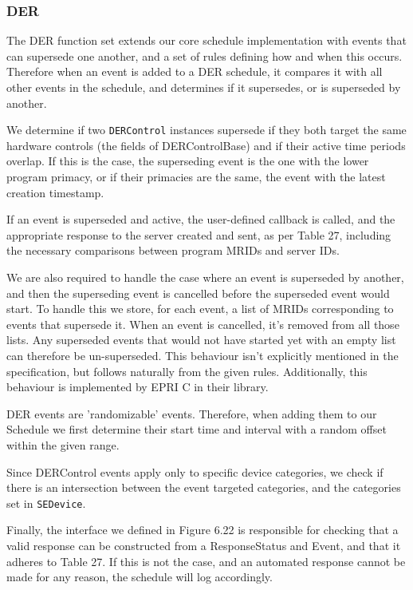 \subsubsection{DER}
The DER function set extends our core schedule implementation with events that can supersede one another, and a set of rules defining how and when this occurs. Therefore when an event is added to a DER schedule, it compares it with all other events in the schedule, and determines if it supersedes, or is superseded by another. 

We determine if two \texttt{DERControl} instances supersede if they both target the same hardware controls (the fields of DERControlBase) and if their active time periods overlap. If this is the case, the superseding event is the one with the lower program primacy, or if their primacies are the same, the event with the latest creation timestamp.

If an event is superseded and active, the user-defined callback is called, and the appropriate response to the server created and sent, as per Table 27, including the necessary comparisons between program MRIDs and server IDs.

We are also required to handle the case where an event is superseded by another, and then the superseding event is cancelled before the superseded event would start. To handle this we store, for each event, a list of MRIDs corresponding to events that supersede it. When an event is cancelled, it's removed from all those lists. Any superseded events that would not have started yet with an empty list can therefore be un-superseded.
This behaviour isn't explicitly mentioned in the specification, but follows naturally from the given rules. Additionally, this behaviour is implemented by EPRI C in their library.

DER events are 'randomizable' events. Therefore, when adding them to our Schedule we first determine their start time and interval with a random offset within the given range.

Since DERControl events apply only to specific device categories, we check if there is an intersection between the event targeted categories, and the categories set in \texttt{SEDevice}.

Finally, the interface we defined in Figure 6.22 is responsible for checking that a valid response can be constructed from a ResponseStatus and Event, and that it adheres to Table 27. If this is not the case, and an automated response cannot be made for any reason, the schedule will log accordingly.

